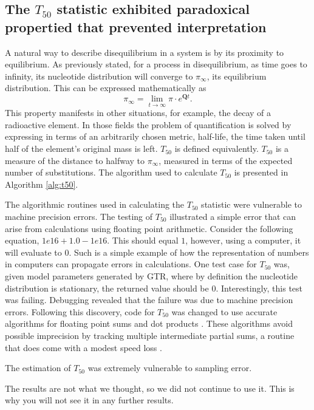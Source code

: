 

\subsection*{The $T_{50}$ statistic exhibited paradoxical propertied that prevented interpretation}

A natural way to describe disequilibrium in a system is by its proximity to equilibrium. As previously stated, for a process in disequilibrium, as time goes to infinity, its nucleotide distribution will converge to $\pi_\infty$, its equilibrium distribution. This can be expressed mathematically as 
$$\pi_\infty = \lim_{t \to \infty}\pi \cdot e^{\mathbf{Q}t}.$$ 
This property manifests in other situations, for example, the decay of a radioactive element. In those fields the problem of quantification is solved by expressing in terms of an arbitrarily chosen metric, half-life, the time taken until half of the element's original mass is left. $T_{50}$ is defined equivalently. ${T_{50}}$ is a measure of the distance to halfway to $\pi_\infty$, measured in terms of the expected number of substitutions. The algorithm used to calculate $T_{50}$ is presented in Algorithm \ref{alg:t50}.

The algorithmic routines used in calculating the $T_{50}$ statistic were vulnerable to machine precision errors. The testing of $T_{50}$ illustrated a simple error that can arise from calculations using \gls{floating point arithmetic}. Consider the following equation, $1e16 + 1.0 - 1e16$. This should equal $1$, however, using a computer, it will evaluate to $0$. Such is a simple example of how the representation of numbers in computers can propagate errors in calculations. One test case for $T_{50}$ was, given model parameters generated by GTR, where by definition the nucleotide distribution is stationary, the returned value should be $0$. Interestingly, this test was failing. Debugging revealed that the failure was due to machine precision errors. Following this discovery, code for $T_{50}$ was changed to use accurate algorithms for floating point sums and dot products \citep{accupy}. These algorithms avoid possible imprecision by tracking multiple intermediate partial sums, a routine that does come with a modest speed loss \citep{Shewchuk1997AdaptivePredicates, Ogita2005AccurateProduct}. 

The estimation of $T_{50}$ was extremely vulnerable to sampling error. 

The results are not what we thought, so we did not continue to use it. This is why you will not see it in any further results. 


